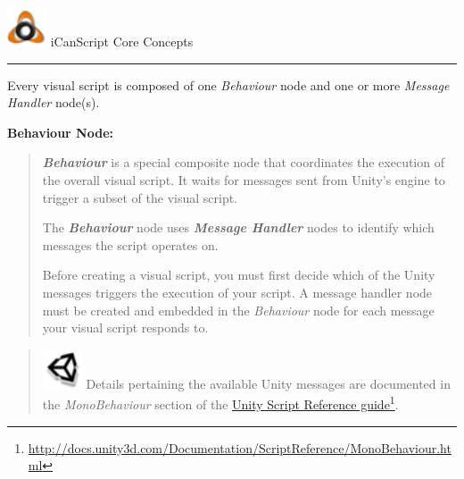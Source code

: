 \begin{tipbox}

\includegraphics[width=33pt,height=33pt]{iCanScriptLogo_32x32x32.png} {\Large \color{black} iCanScript Core Concepts }

\begin{center}\rule{\textwidth}{0.4pt}\end{center}

Every visual script is composed of one \emph{Behaviour} node and one or more \emph{Message Handler} node(s).

\textbf{Behaviour Node:}

\begin{quote}

\emph{\textbf{Behaviour}} is a special composite node that coordinates the execution of the overall visual script. It waits for messages sent from Unity's engine to trigger a subset of the visual script.

The \emph{\textbf{Behaviour}} node uses \emph{\textbf{Message Handler}} nodes to identify which messages the script operates on.

Before creating a visual script, you must first decide which of the Unity messages triggers the execution of your script. A message handler node must be created and embedded in the \emph{Behaviour} node for each message your visual script responds to.
\end{quote}

\begin{tipbox}


\begin{quote}

\includegraphics[width=33pt,height=33pt]{UnityLogo_32x32.png} Details pertaining the available Unity messages are documented in the \emph{MonoBehaviour} section of the \href{http://docs.unity3d.com/Documentation/ScriptReference/MonoBehaviour.html}{Unity Script Reference guide}\footnote{\href{http://docs.unity3d.com/Documentation/ScriptReference/MonoBehaviour.html}{http:/\slash docs.unity3d.com\slash Documentation\slash ScriptReference\slash MonoBehaviour.html}}.
\end{quote}


\end{tipbox}
\end{tipbox}
